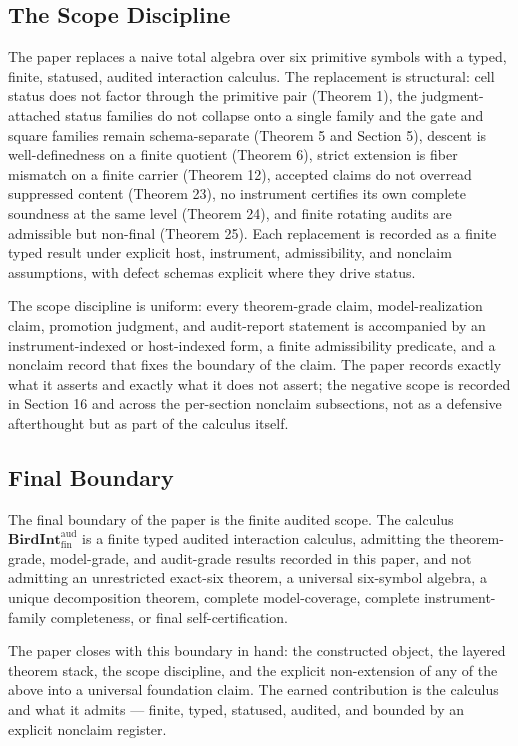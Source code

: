 \documentclass[11pt]{article}
\theoremstyle{definition}
\begin{document}
\subsection{The Scope Discipline}

The paper replaces a naive total algebra over six primitive symbols with a typed, finite, statused, audited interaction calculus. The replacement is structural: cell status does not factor through the primitive pair (Theorem 1), the judgment-attached status families do not collapse onto a single family and the gate and square families remain schema-separate (Theorem 5 and Section 5), descent is well-definedness on a finite quotient (Theorem 6), strict extension is fiber mismatch on a finite carrier (Theorem 12), accepted claims do not overread suppressed content (Theorem 23), no instrument certifies its own complete soundness at the same level (Theorem 24), and finite rotating audits are admissible but non-final (Theorem 25). Each replacement is recorded as a finite typed result under explicit host, instrument, admissibility, and nonclaim assumptions, with defect schemas explicit where they drive status.

The scope discipline is uniform: every theorem-grade claim, model-realization claim, promotion judgment, and audit-report statement is accompanied by an instrument-indexed or host-indexed form, a finite admissibility predicate, and a nonclaim record that fixes the boundary of the claim. The paper records exactly what it asserts and exactly what it does not assert; the negative scope is recorded in Section 16 and across the per-section nonclaim subsections, not as a defensive afterthought but as part of the calculus itself.

\subsection{Final Boundary}

The final boundary of the paper is the finite audited scope. The calculus \(\mathbf{BirdInt}^{\mathrm{aud}}_{\mathrm{fin}}\) is a finite typed audited interaction calculus, admitting the theorem-grade, model-grade, and audit-grade results recorded in this paper, and not admitting an unrestricted exact-six theorem, a universal six-symbol algebra, a unique decomposition theorem, complete model-coverage, complete instrument-family completeness, or final self-certification.

The paper closes with this boundary in hand: the constructed object, the layered theorem stack, the scope discipline, and the explicit non-extension of any of the above into a universal foundation claim. The earned contribution is the calculus and what it admits --- finite, typed, statused, audited, and bounded by an explicit nonclaim register.
 
\end{document}
